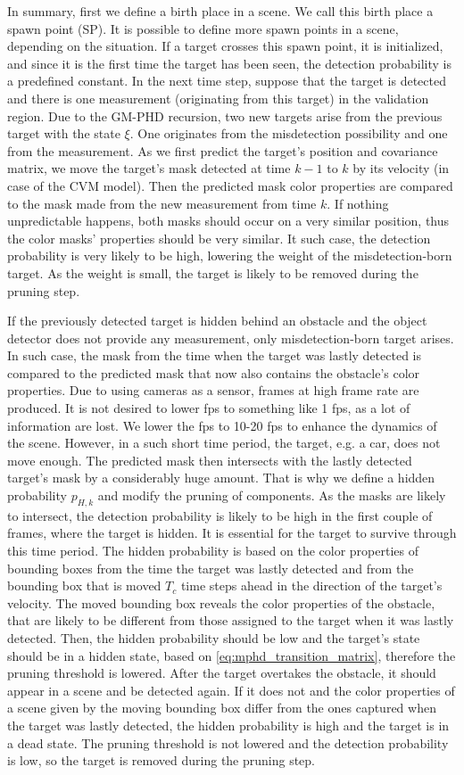In summary, first we define a birth place in a scene. We call this birth place a spawn point (SP). It is possible to
define more spawn points in a scene, depending on the situation. If a target crosses this spawn point, it is
initialized, and since it is the first time the target has been seen, the detection probability is a predefined
constant. In the
next time step, suppose that the target is detected and there is one measurement (originating from this target) in the
validation region. Due to the GM-PHD recursion, two new targets arise from the previous target with the state $\xi$.
One originates from
the misdetection possibility and one from the measurement. As
we first predict the target's position and covariance
matrix, we move the target's mask detected at time $k-1$ to $k$ by its velocity (in case of the CVM model). Then the
predicted mask color properties are compared to the mask made from the new measurement from time $k$. If nothing
unpredictable happens, both masks should occur on a very similar position, thus the color masks' properties should be
very similar. It such case, the detection probability is very likely to be high, lowering the weight of the
misdetection-born target. As the weight is small, the target is likely to be removed during the pruning step.

If the previously detected target is hidden behind an obstacle and the object detector does not provide any
measurement, only misdetection-born target arises. In such case, the mask from the time when the target was lastly
detected is compared to the predicted mask that now also contains the obstacle's color properties. Due to using
cameras as
a sensor, frames at high frame rate are produced. It is not desired to lower fps to something like 1 fps, as a lot of
information are lost. We lower the fps to 10-20 fps to enhance the dynamics of the scene. However, in a such short time
period, the target, e.g. a car, does not move enough. The predicted mask then intersects with the lastly
detected target's mask by a considerably huge amount. That is why we define a hidden probability $p_{H,k}$ and modify
the pruning of components. As the masks are likely to intersect, the detection probability is likely to be high in
the first couple of frames, where the target is hidden. It is essential for the target to survive through this time
period. The hidden probability is based on the color properties of bounding boxes from the time the target was lastly
detected
and from the bounding box that is moved $T_c$ time steps ahead in the direction of the target's velocity. The moved
bounding box reveals the color properties of the obstacle, that are likely to be different from those assigned to the
target
when it was lastly detected. Then, the hidden probability should be low and the target's state should be in a hidden
state,
based on \ref{eq:mphd_transition_matrix}, therefore the pruning threshold is lowered. After the target overtakes the
obstacle,
it should appear in a scene and be detected again. If it does not and the color properties of a scene given by the
moving
bounding box differ from the ones captured when the target was lastly detected, the hidden probability is high and the
target is
in a dead state. The pruning threshold is not lowered and the detection probability is low, so the target is removed
during the pruning step.
